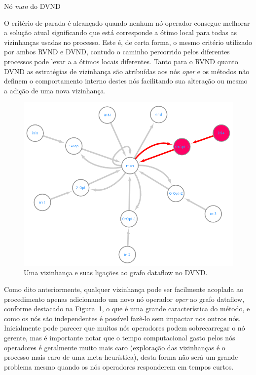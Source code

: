 \begin{algorithm}[htpb]
\caption{Nó \textit{man} do DVND}
\label{alg:dvndMan}
\begin{algorithmic}[1]
    \EndFunction
\end{algorithmic}
\end{algorithm}

O critério de parada é alcançado quando nenhum nó operador consegue melhorar a solução atual significando que está corresponde a ótimo local para todas as vizinhanças usadas no processo.
Este é, de certa forma, o mesmo critério utilizado por ambos RVND e DVND, contudo o caminho percorrido pelos diferentes processos pode levar a a ótimos locais diferentes. Tanto para o RVND quanto DVND as estratégias de vizinhança são atribuídas aos nós \textit{oper} e os métodos não definem o comportamento interno destes nós facilitando sua alteração ou mesmo a adição de uma nova vizinhança.

\begin{figure}[htbp]
    \centerline{\includegraphics[scale=0.6]{figuras/dvnd/DVND_dataflow_nomesDestacado.png}}
    \caption{Uma vizinhança e suas ligações ao grafo dataflow no DVND.}
    \label{fig:dvndGraphDestacado}
\end{figure}

Como dito anteriormente, qualquer vizinhança pode ser facilmente acoplada ao procedimento apenas adicionando um novo nó operador \textit{oper} ao grafo dataflow, conforme destacado na Figura~\ref{fig:dvndGraphDestacado}, o que é uma grande característica do método, e como os nós são independentes é possível fazê-lo sem impactar nos outros nós.
Inicialmente pode parecer que muitos nós operadores podem sobrecarregar o nó gerente, mas é importante notar que o tempo computacional gasto pelos nós operadores é geralmente muito mais caro (exploração das vizinhanças é o processo mais caro de uma meta-heurística), desta forma não será um grande problema mesmo quando os nós operadores responderem em tempos curtos.

